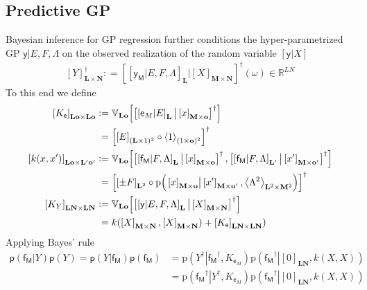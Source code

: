 \documentclass[preprint,12pt]{elsarticle}
\newcommand*{\M}[1]{\ensuremath{#1}\xspace}
\newcommand*{\x}{\times}
\newcommand*{\mi}[1]{\mathbf{#1}}
\newcommand*{\st}[1]{\mathbb{#1}}
\newcommand*{\rv}[1]{\mathsf{#1}}
\newcommand*{\te}[2][]{\left\lbrack{#2}\right\rbrack_{#1}}
\newcommand*{\diag}[2][]{\left\langle{#2}\right\rangle_{#1}}
\newcommand*{\prob}[3]{\M{\mathrm{p}\!\left(\left.{#1}\right\vert{#2,#3}\right)}}
\newcommand*{\deq}{\M{\mathrel{\mathop:}=}}
\newcommand*{\cov}[3][]{\ifthenelse{\equal{#1}{}}{\mathbb{V}_{#3}\!\left\lbrack{#2}\right\rbrack}{\mathbb{V}_{#3}\!\left\lbrack{#2,#1}\right\rbrack}}
\begin{document}
    \subsection{Predictive GP} \label{sub:GPR:Predictive}
        Bayesian inference for GP regression further conditions the hyper-parametrized GP $\rv{y} \vert E,F,\Lambda$ on the observed realization of the random variable $\te{\rv{y}\vert X}$
        \begin{equation*}
            \te[\mi{L} \x \mi{N}]{Y}^{\dagger} \deq \te{\te[\mi{L}]{\rv{y_M}\vert E,F,\Lambda} \big\vert \te[\mi{M}\x\mi{N}]{X}}^{\dagger}\!(\omega) \in \st{R}^{LN}
        \end{equation*}
        To this end we define
        \begin{equation} \label{def:GPR:Kk}
            \begin{aligned}
                \te[\mi{Lo}\x\mi{Lo}]{K_{\rv{e}}} &\deq 
                \cov{\te{\te[\mi{L}]{\rv{e}_{M}\vert E} \big\vert \te[\mi{M}\x\mi{o}]{x}}^{\dagger}}{\mi{Lo}} \\
                &\phantom{:}= \te{\te[(\mi{L}\x 1)^2]{E} \circ \diag[(1\x\mi{o})^2]{1}}^{\dagger} \\
                \te[\mi{Lo}\x\mi{L^{\prime}o^{\prime}}]{k(x, x^{\prime})} &\deq
                \cov[{\te{\te[\mi{L^{\prime}}]{\rv{f_M}\vert F,\Lambda} \big\vert \te[\mi{M}\x\mi{o^{\prime}}]{x^{\prime}}}^{\dagger}}]
                {\te{\te[\mi{L}]{\rv{f_M}\vert F,\Lambda} \big\vert \te[\mi{M}\x\mi{o}]{x}}^{\dagger}}{\mi{Lo}} \\
                &\phantom{:}= \te{\te[\mi{L}^{2}]{\pm F} \circ 
                \prob{\te[\mi{M}\x\mi{o}]{x}}{\te[\mi{M}\x\mi{o^{\prime}}]{x^{\prime}}}
                {\diag[\mi{L}^{2}\x\mi{M}^{2}]{\Lambda^{2}}}}^{\dagger} \\
                \te[\mi{LN}\x\mi{LN}]{K_{Y}} &\deq 
                \cov{\te{\te[\mi{L}]{\rv{y}\vert E,F,\Lambda} \big\vert \te[\mi{M}\x\mi{N}]{X}}^{\dagger}}{\mi{Lo}} \\
                &\phantom{:}= k(\te[\mi{M}\x\mi{N}]{X},\te[\mi{M}\x\mi{N}]{X}) + \te[\mi{LN}\x\mi{LN}]{K_{\rv{e}}})
            \end{aligned}
        \end{equation}
        Applying Bayes' rule
        \begin{equation*}
            \begin{aligned}
                \mathsf{p}(\rv{f_M}\vert Y)\mathsf{p}(Y) = \mathsf{p}(Y\vert \rv{f_M})\mathsf{p}(\rv{f_M})
                &= \prob{Y^{\dagger}}{\rv{f_M}^{\dagger}}{K_{\rv{e}_{M}}} \prob{\rv{f_M}^{\dagger}}{\te[\mi{LN}]{0}}{k(X,X)} \\
                &= \prob{\rv{f_M}^{\dagger}}{Y^{\dagger}}{K_{\rv{e}_{M}}} \prob{\rv{f_M}^{\dagger}}{\te[\mi{LN}]{0}}{k(X,X)}
            \end{aligned}
        \end{equation*}
\end{document}
